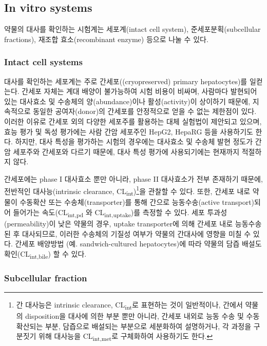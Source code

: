 \documentclass[
  11pt,
  krantz2, a4paper, twoside]{krantz}
\begin{document}
\hypertarget{in-vitro-systems}{%
\subsection{In vitro systems}\label{in-vitro-systems}}

약물의 대사를 확인하는 시험계는 세포계(intact cell system),
준세포분획(subcellular fractions), 재조합 효소(recombinant enzyme)
등으로 나눌 수 있다.

\hypertarget{intact-cell-systems}{%
\subsubsection{Intact cell systems}\label{intact-cell-systems}}

대사를 확인하는 세포계는 주로 간세포((cryopreserved) primary
hepatocytes)를 일컫는다. 간세포 자체는 계대 배양이 불가능하여 시험
비용이 비싸며, 사람마다 발현되어 있는 대사효소 및 수송체의
양(abundance)이나 활성(activity)이 상이하기 때문에, 지속적으로 동일한
공여자(donor)의 간세포를 안정적으로 얻을 수 없는 제한점이 있다. 이러한
이유로 간세포 외의 다양한 세포주를 활용하는 대체 실험법이 제안되고
있으며, 효능 평가 및 독성 평가에는 사람 간암 세포주인 HepG2, HepaRG 등을
사용하기도 한다. 하지만, 대사 특성을 평가하는 시험의 경우에는 대사효소
및 수송체 발현 정도가 간암 세포주와 간세포와 다르기 때문에, 대사 특성
평가에 사용되기에는 현재까지 적절하지 않다.

간세포에는 phase I 대사효소 뿐만 아니라, phase II 대사효소가 전부
존재하기 때문에, 전반적인 대사능(intrinsic clearance, CL\textsubscript{int})\footnote{간 대사능은 intrinsic clearance, CL\textsubscript{int}로 표현하는 것이 일반적이나, 간에서 약물의 disposition을 대사에 의한 부분 뿐만 아니라, 간세포 내외로 능동 수송 및 수동 확산되는 부분, 담즙으로 배설되는 부분으로 세분화하여 설명하거나, 각 과정을 구분짓기 위해 대사능을 CL\textsubscript{int,met}로 구체화하여 사용하기도 한다.}을
관찰할 수 있다. 또한, 간세포 내로 약물이 수동확산 또는
수송체(transporter)를 통해 간으로 능동수송(active transport)되어
들어가는 속도(CL\textsubscript{int,pd} 와 CL\textsubscript{int,uptake})를 측정할 수 있다. 세포
투과성(permeability)이 낮은 약물의 경우, uptake transporter에 의해
간세포 내로 능동수송 된 후 대사되므로, 이러한 수송체의 기질성 여부가
약물의 간대사에 영향을 미칠 수 있다. 간세포 배양방법 (예.
sandwich-cultured hepatocytes)에 따라 약물의 담즙 배설도
확인(CL\textsubscript{int,bile}) 할 수 있다.

\hypertarget{subcellular-fraction}{%
\subsubsection{Subcellular fraction}\label{subcellular-fraction}}
\end{document}
